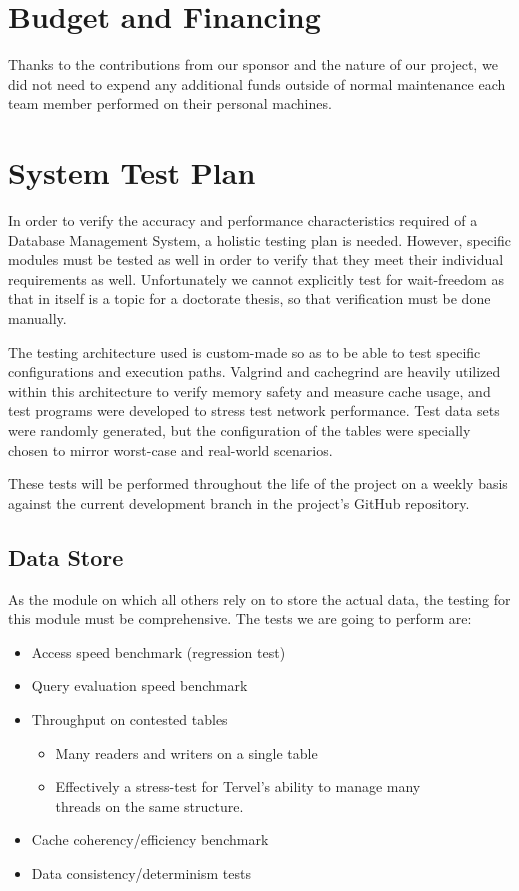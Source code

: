 \documentclass[letterpaper, 12pt]{article}
\begin{document}
\section{Budget and Financing}
Thanks to the contributions from our sponsor and the nature of our project, we did not need to expend
any additional funds outside of normal maintenance each team member performed on their personal
machines.
\newpage

\section{System Test Plan}
In order to verify the accuracy and performance characteristics required of a Database Management System,
a holistic testing plan is needed. However, specific modules must be tested as well in order to 
verify that they meet their individual requirements as well. Unfortunately we cannot explicitly test
for wait-freedom as that in itself is a topic for a doctorate thesis, so that verification must
be done manually.
\par\vspace{\baselineskip}
The testing architecture used is custom-made so as to be able to test specific configurations and 
execution paths. Valgrind and cachegrind are heavily utilized within this architecture  to verify 
memory safety and measure cache usage, and test programs were developed to stress test network 
performance. Test data sets were randomly generated, but the configuration of the tables were
specially chosen to mirror worst-case and real-world scenarios.
\par\vspace{\baselineskip}
These tests will be performed throughout the life of the project on a weekly basis against the current
development branch in the project's GitHub repository. 

\subsection{Data Store}
As the module on which all others rely on to store the actual data, the testing for this
module must be comprehensive. The tests we are going to perform are:
\begin{itemize}
 \item Access speed benchmark (regression test)
 \item Query evaluation speed benchmark
 \item Throughput on contested tables
 \begin{itemize}
  \item Many readers and writers on a single table
  \item Effectively a stress-test for Tervel's ability to manage many \\ threads on the same
	structure.
 \end{itemize}
 \item Cache coherency/efficiency benchmark 
 \item Data consistency/determinism tests
\end{itemize}
\end{document}

